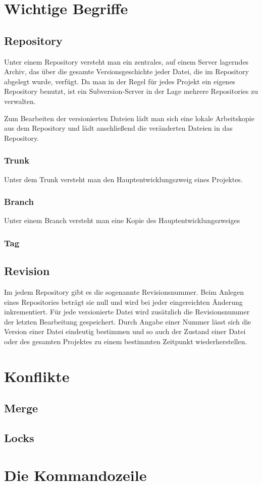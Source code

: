 \section{Wichtige Begriffe}
	\subsection{Repository}
		Unter einem Repository versteht man ein zentrales, auf einem Server 
		lagerndes Archiv, das über die gesamte Versionsgeschichte jeder Datei, 
		die im Repository abgelegt wurde, verfügt.
		Da man in der Regel für jedes Projekt ein eigenes Repository benutzt, 
		ist ein Subversion-Server in der Lage mehrere Repositories zu verwalten.
		
		Zum Bearbeiten der versionierten Dateien lädt man sich eine lokale 
		Arbeitskopie aus dem Repository und lädt anschließend die veränderten 
		Dateien in das Repository.
		
		\subsubsection{Trunk}
			Unter dem Trunk versteht man den Hauptentwicklungszweig eines 
			Projektes.
		\subsubsection{Branch}
			Unter einem Branch versteht man eine Kopie des 
			Hauptentwicklungszweiges
		\subsubsection{Tag}
	\subsection{Revision}
		Im jedem Repository gibt es die sogenannte Revisionsnummer. Beim Anlegen 
		eines Repositories beträgt sie null und wird bei jeder eingereichten 
		Änderung inkrementiert. Für jede versionierte Datei wird zusätzlich die
		Revisionsnummer der letzten Bearbeitung gespeichert.
	 	Durch Angabe einer Nummer lässt sich die Version einer Datei eindeutig 
	 	bestimmen und so auch der Zustand einer Datei oder des gesamten Projektes 
	 	zu einem bestimmten Zeitpunkt wiederherstellen.
	 	
\section{Konflikte}
	\subsection{Merge}
	\subsection{Locks}

\section{Die Kommandozeile}
